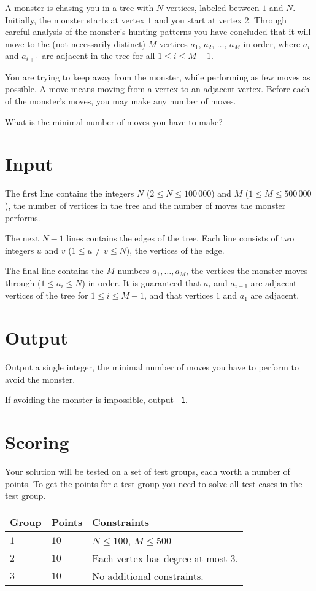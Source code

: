 A monster is chasing you in a tree with $N$ vertices, labeled between $1$ and $N$.
Initially, the monster starts at vertex $1$ and you start at vertex $2$.
Through careful analysis of the monster's hunting patterns you have concluded that it will move to the (not necessarily distinct) $M$ vertices $a_1$, $a_2$, $\dots$, $a_M$ in order, where $a_i$ and $a_{i+1}$ are adjacent in the tree for all $1 \le i \le M - 1$.

You are trying to keep away from the monster, while performing as few moves as possible.
A move means moving from a vertex to an adjacent vertex.
Before each of the monster's moves, you may make any number of moves.

What is the minimal number of moves you have to make?

\section*{Input}
The first line contains the integers $N$ ($2 \le N \le 100\,000$) and $M$ ($1 \le M \le 500\,000$), the number of vertices in the tree and the number of moves the monster performs.

The next $N-1$ lines contains the edges of the tree.
Each line consists of two integers $u$ and $v$ ($1 \le u \neq v \le N$), the vertices of the edge.

The final line contains the $M$ numbers $a_1, \dots, a_M$, the vertices the monster moves through ($1 \le a_i \le N$) in order.
It is guaranteed that $a_i$ and $a_{i+1}$ are adjacent vertices of the tree for $1 \le i \le M-1$, and that vertices $1$ and $a_1$ are adjacent.

\section*{Output}
Output a single integer, the minimal number of moves you have to perform to avoid the monster.

If avoiding the monster is impossible, output \texttt{-1}.

\section*{Scoring}
Your solution will be tested on a set of test groups, each worth a number of points.
To get the points for a test group you need to solve all test cases in the test group.

\noindent
\begin{tabular}{| l | l | p{10cm} |}
  \hline
  Group & Points & Constraints \\ \hline
  $1$   & $10$   & $N \le 100$, $M \le 500$ \\ \hline
  $2$   & $10$   & Each vertex has degree at most $3$. \\ \hline
  $3$   & $10$   & No additional constraints. \\ \hline
\end{tabular}
